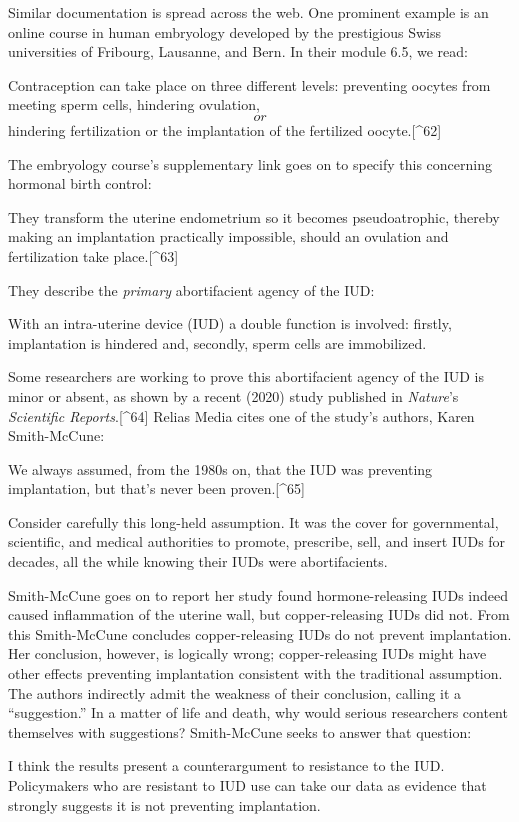\documentclass[
]{book}
\begin{document}
Similar documentation is spread across the web. One prominent example is an online course in human embryology developed by the prestigious Swiss universities of Fribourg, Lausanne, and Bern. In their module 6.5, we read:

Contraception can take place on three different levels: preventing oocytes from meeting sperm cells, hindering ovulation, \[or\] hindering fertilization or the implantation of the fertilized oocyte.{[}\^{}62{]}

The embryology course's supplementary link goes on to specify this concerning hormonal birth control:

They transform the uterine endometrium so it becomes pseudoatrophic, thereby making an implantation practically impossible, should an ovulation and fertilization take place.{[}\^{}63{]}

They describe the \emph{primary} abortifacient agency of the IUD:

With an intra-uterine device (IUD) a double function is involved: firstly, implantation is hindered and, secondly, sperm cells are immobilized.

Some researchers are working to prove this abortifacient agency of the IUD is minor or absent, as shown by a recent (2020) study published in \emph{Nature}'s \emph{Scientific Reports}.{[}\^{}64{]} Relias Media cites one of the study's authors, Karen Smith-McCune:

We always assumed, from the 1980s on, that the IUD was preventing implantation, but that's never been proven.{[}\^{}65{]}

Consider carefully this long-held assumption. It was the cover for governmental, scientific, and medical authorities to promote, prescribe, sell, and insert IUDs for decades, all the while knowing their IUDs were abortifacients.

Smith-McCune goes on to report her study found hormone-releasing IUDs indeed caused inflammation of the uterine wall, but copper-releasing IUDs did not. From this Smith-McCune concludes copper-releasing IUDs do not prevent implantation. Her conclusion, however, is logically wrong; copper-releasing IUDs might have other effects preventing implantation consistent with the traditional assumption. The authors indirectly admit the weakness of their conclusion, calling it a ``suggestion.'' In a matter of life and death, why would serious researchers content themselves with suggestions? Smith-McCune seeks to answer that question:

I think the results present a counterargument to resistance to the IUD. Policymakers who are resistant to IUD use can take our data as evidence that strongly suggests it is not preventing implantation.
\end{document}
